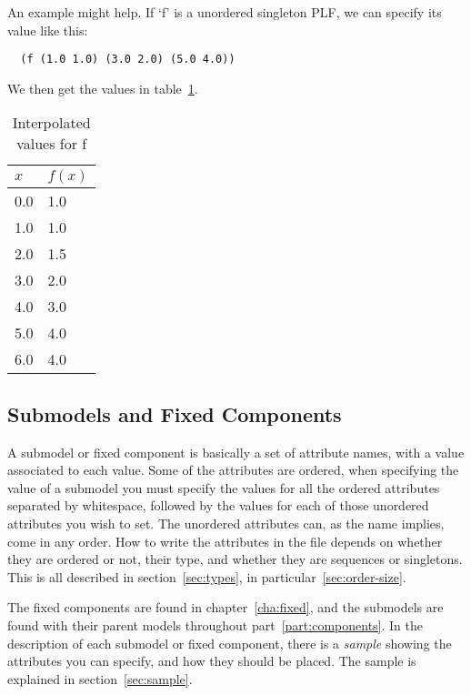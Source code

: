 An example might help.  If `f' is a unordered singleton PLF, we can
specify its value like this:
\begin{verbatim}
  (f (1.0 1.0) (3.0 2.0) (5.0 4.0))
\end{verbatim}
We then get the values in table~\ref{tab:plf}.

\begin{table}[htbp]
  \begin{center}
    \begin{tabular}{l|l}
      $x$ & $f(x)$ \\\hline
      0.0 & 1.0 \\\hline
      1.0 & 1.0 \\\hline
      2.0 & 1.5 \\\hline
      3.0 & 2.0 \\\hline
      4.0 & 3.0 \\\hline
      5.0 & 4.0 \\\hline
      6.0 & 4.0 
    \end{tabular}
    \caption{Interpolated values for f}
    \label{tab:plf}
  \end{center}
\end{table}

\subsection{Submodels and Fixed Components}
\label{type:alist}

A submodel or fixed component is basically a set of attribute names,
with a value associated to each value.  Some of the attributes are
ordered, when specifying the value of a submodel you must specify the
values for all the ordered attributes separated by whitespace,
followed by the values for each of those unordered attributes you wish
to set.  The unordered attributes can, as the name implies, come in
any order.  How to write the attributes in the file depends on whether
they are ordered or not, their type, and whether they are sequences or
singletons.  This is all described in section~\ref{sec:types}, in
particular~\ref{sec:order-size}.

The fixed components are found in chapter~\ref{cha:fixed}, and the
submodels are found with their parent models throughout
part~\ref{part:components}.  In the description of each submodel or
fixed component, there is a \emph{sample} showing the attributes you
can specify, and how they should be placed.  The sample is explained in
section~\ref{sec:sample}. 


